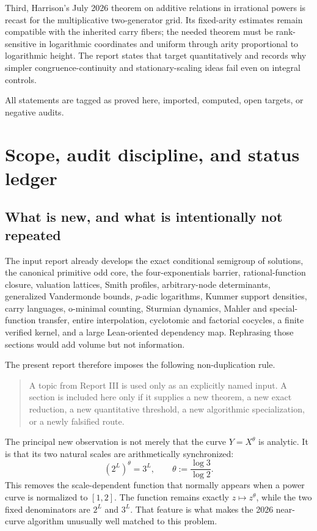 \documentclass[11pt,oneside]{article}
\theoremstyle{definition}
\theoremstyle{remark}
\newcommand{\tht}{\theta}
\begin{document}
\begin{titlepage}
\begin{minipage}{0.92\textwidth}
Third, Harrison's July 2026 theorem on additive relations in irrational powers is recast for the
multiplicative two-generator grid.  Its fixed-arity estimates remain compatible with the inherited
carry fibers; the needed theorem must be rank-sensitive in logarithmic coordinates and uniform
through arity proportional to logarithmic height.  The report states that target quantitatively
and records why simpler congruence-continuity and stationary-scaling ideas fail even on integral
controls.
\end{minipage}
\vfill
{\small All statements are tagged as proved here, imported, computed, open targets, or negative audits.}
\end{titlepage}

\clearpage
{}
\tableofcontents
\clearpage
{}

\section{Scope, audit discipline, and status ledger}

\subsection{What is new, and what is intentionally not repeated}

The input report already develops the exact conditional semigroup of solutions, the canonical
primitive odd core, the four-exponentials barrier, rational-function closure, valuation lattices,
Smith profiles, arbitrary-node determinants, generalized Vandermonde bounds, $p$-adic logarithms,
Kummer support densities, carry languages, o-minimal counting, Sturmian dynamics, Mahler and
special-function transfer, entire interpolation, cyclotomic and factorial cocycles, a finite
verified kernel, and a large Lean-oriented dependency map.  Rephrasing those sections would add
volume but not information.

The present report therefore imposes the following non-duplication rule.

\begin{quote}
A topic from Report III is used only as an explicitly named input.  A section is included here
only if it supplies a new theorem, a new exact reduction, a new quantitative threshold, a new
algorithmic specialization, or a newly falsified route.
\end{quote}

The principal new observation is not merely that the curve $Y=X^{\tht}$ is analytic.  It is that
its two natural scales are arithmetically synchronized:
\[
  (2^L)^{\tht}=3^L,\qquad \tht:=\frac{\log 3}{\log 2}.
\]
This removes the scale-dependent function that normally appears when a power curve is normalized
to $[1,2]$.  The function remains exactly $z\mapsto z^{\tht}$, while the two fixed denominators are
$2^L$ and $3^L$.  That feature is what makes the 2026 near-curve algorithm unusually well matched
to this problem.
\end{document}
